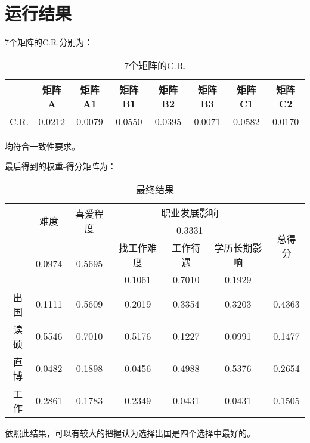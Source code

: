\documentclass[UTF8]{ctexart}
\begin{document}
\section{运行结果}
7个矩阵的C.R.分别为：\par
\begin{table}[!hbp]
\centering
\begin{tabular}{|c|c|c|c|c|c|c|c|}
\hline
\hline
      & 矩阵A  & 矩阵A1 & 矩阵B1 & 矩阵B2 & 矩阵B3 & 矩阵C1 & 矩阵C2 \\
\hline
C.R.  & 0.0212 & 0.0079 & 0.0550 & 0.0395 & 0.0071 & 0.0582 & 0.0170 \\
\hline
\end{tabular}
\caption{7个矩阵的C.R.}
\vspace{4mm}
\end{table}
均符合一致性要求。\par
最后得到的权重-得分矩阵为：\par
\begin{table}[!hbp]
\centering
\begin{tabular}{@{}ccccccc@{}}
\toprule
 & \multirow{2}{*}{难度} & \multirow{2}{*}{喜爱程度} & \multicolumn{3}{c}{职业发展影响} & \multirow{4}{*}{总得分} \\
 & & & \multicolumn{3}{c}{0.3331} & \\
\cline{4-6}
 & \multirow{2}{*}{0.0974} & \multirow{2}{*}{0.5695} & 找工作难度 & 工作待遇 & 学历长期影响 & \\
 & & & 0.1061 & 0.7010 & 0.1929 & \\
\midrule
出国 & 0.1111 & 0.5609 & 0.2019 & 0.3354 & 0.3203 & 0.4363 \\
读硕 & 0.5546 & 0.7010 & 0.5176 & 0.1227 & 0.0991 & 0.1477 \\
直博 & 0.0482 & 0.1898 & 0.0456 & 0.4988 & 0.5376 & 0.2654 \\
工作 & 0.2861 & 0.1783 & 0.2349 & 0.0431 & 0.0431 & 0.1505 \\
\bottomrule
\end{tabular}
\caption[]{最终结果}
\vspace{4mm}
\end{table}
依照此结果，可以有较大的把握认为选择出国是四个选择中最好的。\par
\end{document}
